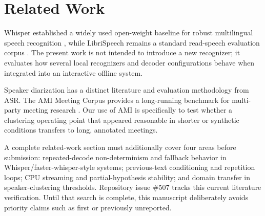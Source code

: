 \section{Related Work}

Whisper established a widely used open-weight baseline for robust multilingual speech recognition
\citep{radford2022whisper}, while LibriSpeech remains a standard read-speech evaluation corpus
\citep{panayotov2015librispeech}. The present work is not intended to introduce a new recognizer;
it evaluates how several local recognizers and decoder configurations behave when integrated into
an interactive offline system.

Speaker diarization has a distinct literature and evaluation methodology from ASR. The AMI
Meeting Corpus provides a long-running benchmark for multi-party meeting research
\citep{carletta2005ami}. Our use of AMI is specifically to test whether a clustering operating
point that appeared reasonable in shorter or synthetic conditions transfers to long, annotated
meetings.

A complete related-work section must additionally cover four areas before submission:
repeated-decode non-determinism and fallback behavior in Whisper/faster-whisper-style systems;
previous-text conditioning and repetition loops; CPU streaming and partial-hypothesis stability;
and domain transfer in speaker-clustering thresholds. Repository issue \#507 tracks this current
literature verification. Until that search is complete, this manuscript deliberately avoids
priority claims such as first or previously unreported.
